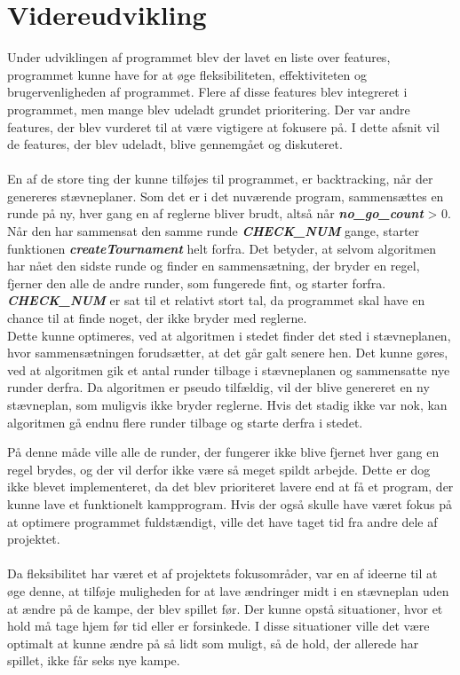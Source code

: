 \section{Videreudvikling}
Under udviklingen af programmet blev der lavet en liste over features, programmet kunne have for at øge fleksibiliteten, effektiviteten og brugervenligheden af programmet. Flere af disse features blev integreret i programmet, men mange blev udeladt grundet prioritering. Der var andre features, der blev vurderet til at være vigtigere at fokusere på. I dette afsnit vil de features, der blev udeladt, blive gennemgået og diskuteret. 
\\\\
En af de store ting der kunne tilføjes til programmet, er backtracking, når der genereres stævneplaner. Som det er i det nuværende program, sammensættes en runde på ny, hver gang en af reglerne bliver brudt, altså når \textbf{\textit{no\_go\_count}} > 0. Når den har sammensat den samme runde \textbf{\textit{CHECK\_NUM}} gange, starter funktionen \textbf{\textit{createTournament}} helt forfra. Det betyder, at selvom algoritmen har nået den sidste runde og finder en sammensætning, der bryder en regel, fjerner den alle de andre runder, som fungerede fint, og starter forfra. \textbf{\textit{CHECK\_NUM}} er sat til et relativt stort tal, da programmet skal have en chance til at finde noget, der ikke bryder med reglerne.
\\
Dette kunne optimeres, ved at algoritmen i stedet finder det sted i stævneplanen, hvor sammensætningen forudsætter, at det går galt senere hen. Det kunne gøres, ved at algoritmen gik et antal runder tilbage i stævneplanen og sammensatte nye runder derfra. Da algoritmen er pseudo tilfældig, vil der blive genereret en ny stævneplan, som muligvis ikke bryder reglerne. Hvis det stadig ikke var nok, kan algoritmen gå endnu flere runder tilbage og starte derfra i stedet.
\par
På denne måde ville alle de runder, der fungerer ikke blive fjernet hver gang en regel brydes, og der vil derfor ikke være så meget spildt arbejde. Dette er dog ikke blevet implementeret, da det blev prioriteret lavere end at få et program, der kunne lave et funktionelt kampprogram. Hvis der også skulle have været fokus på at optimere programmet fuldstændigt, ville det have taget tid fra andre dele af projektet.
\\\\
Da fleksibilitet har været et af projektets fokusområder, var en af ideerne til at øge denne, at tilføje muligheden for at lave ændringer midt i en stævneplan uden at ændre på de kampe, der blev spillet før. Der kunne opstå situationer, hvor et hold må tage hjem før tid eller er forsinkede. I disse situationer ville det være optimalt at kunne ændre på så lidt som muligt, så de hold, der allerede har spillet, ikke får seks nye kampe.
